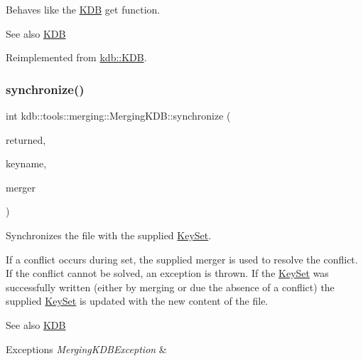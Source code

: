 Behaves like the \mbox{\hyperlink{classkdb_1_1KDB}{K\+DB}} get function. 

\begin{DoxySeeAlso}{See also}
\mbox{\hyperlink{classkdb_1_1KDB}{K\+DB}} 
\end{DoxySeeAlso}


Reimplemented from \mbox{\hyperlink{classkdb_1_1KDB_a48770a7290699bf2b7529f3ab67e378f}{kdb\+::\+K\+DB}}.

\mbox{\label{classkdb_1_1tools_1_1merging_1_1MergingKDB_ae7fb5bd354d16ed90bbf0c4c087b5d6f}} 
\subsubsection{\texorpdfstring{synchronize()}{synchronize()}\hspace{0.1cm}{\footnotesize\ttfamily [1/2]}}
{\footnotesize\ttfamily int kdb\+::tools\+::merging\+::\+Merging\+K\+D\+B\+::synchronize (\begin{DoxyParamCaption}\item[{\mbox{\hyperlink{classkdb_1_1KeySet}{Key\+Set}} \&}]{returned,  }\item[{std\+::string const \&}]{keyname,  }\item[{Three\+Way\+Merge \&}]{merger }\end{DoxyParamCaption})\hspace{0.3cm}{\ttfamily [virtual]}}



Synchronizes the file with the supplied \mbox{\hyperlink{classkdb_1_1KeySet}{Key\+Set}}. 

If a conflict occurs during set, the supplied merger is used to resolve the conflict. If the conflict cannot be solved, an exception is thrown. If the \mbox{\hyperlink{classkdb_1_1KeySet}{Key\+Set}} was successfully written (either by merging or due the absence of a conflict) the supplied \mbox{\hyperlink{classkdb_1_1KeySet}{Key\+Set}} is updated with the new content of the file.

\begin{DoxySeeAlso}{See also}
\mbox{\hyperlink{classkdb_1_1KDB}{K\+DB}} 
\end{DoxySeeAlso}

\begin{DoxyExceptions}{Exceptions}
{\em Merging\+K\+D\+B\+Exception} & \\
\hline
\end{DoxyExceptions}
\mbox{\label{classkdb_1_1tools_1_1merging_1_1MergingKDB_adcb436c4bf35c89c67ae2f5b3f1a9cfd}} 
